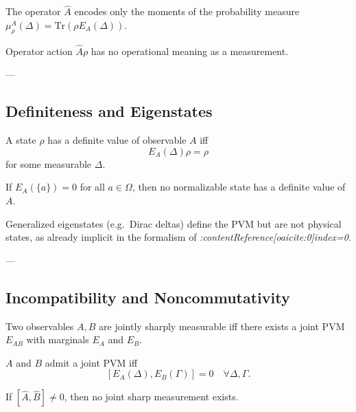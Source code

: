 \documentclass[11pt]{article}
\begin{document}
\begin{proposition}
The operator $\hat A$ encodes only the moments of the probability measure
$\mu_\rho^A(\Delta)=\mathrm{Tr}(\rho E_A(\Delta))$.
\end{proposition}

\begin{corollary}
Operator action $\hat A\rho$ has no operational meaning as a measurement.
\end{corollary}

---

\subsection*{Definiteness and Eigenstates}

\begin{definition}
A state $\rho$ has a definite value of observable $A$ iff
\[
E_A(\Delta)\rho=\rho
\]
for some measurable $\Delta$.
\end{definition}

\begin{theorem}
If $E_A(\{a\})=0$ for all $a\in\Omega$, then no normalizable state has a
definite value of $A$.
\end{theorem}

\begin{remark}
Generalized eigenstates (e.g.\ Dirac deltas) define the PVM but are not
physical states, as already implicit in the formalism of
\emph{:contentReference[oaicite:0]{index=0}}.
\end{remark}

---

\subsection*{Incompatibility and Noncommutativity}

\begin{definition}
Two observables $A,B$ are jointly sharply measurable iff there exists a
joint PVM $E_{AB}$ with marginals $E_A$ and $E_B$.
\end{definition}

\begin{theorem}
$A$ and $B$ admit a joint PVM iff
\[
[E_A(\Delta),E_B(\Gamma)]=0
\quad \forall \Delta,\Gamma.
\]
\end{theorem}

\begin{corollary}
If $[\hat A,\hat B]\neq 0$, then no joint sharp measurement exists.
\end{corollary}
\end{document}
